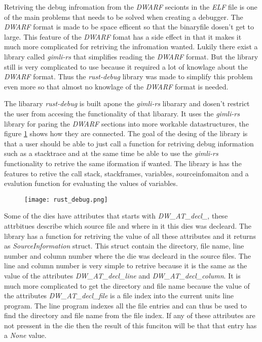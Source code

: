 
Retriving the debug infromation from the \emph{DWARF} secionts in the \emph{ELF} file is one of the main problems that needs to be solved when creating a debugger.
The \emph{DWARF} format is made to be space efficent so that the binaryfile dosen't get to large.
This feature of the \emph{DWARF} fomat has a side effect in that it makes it much more complicated for retriving the infromation wanted.
Lukily there exist a library called \emph{gimli-rs} that simplifies reading the \emph{DWARF} format.
But the library still is very complicated to use because it required a lot of knowlage about the \emph{DWARF} format.
Thus the \emph{rust-debug} library was made to simplify this problem even more so that almost no knowlage of the \emph{DWARF} format is needed.


The libarary \emph{rust-debug} is built apone the \emph{gimli-rs} libarary and dosen't restrict the user from accesing the functionality of that libarary.
It uses the \emph{gimli-rs} library for paring the \emph{DWARF} sections into more workable datastructures, the figure \ref{fig:rustdebug} shows how they are connected.
The goal of the desing of the library is that a user should be able to just call a function for retriving debug information such as a stacktrace and at the same time be able to use the \emph{gimli-rs} functionality to retrive the same iformation if wanted.
The library is has the features to retive the call stack, stackframes, variables, sourceinfomaiton and a evalution function for evaluating the values of variables.


\begin{figure}[h]
    \centering
    \texttt{[image: rust\_debug.png]}
    \label{fig:rustdebug}
\end{figure}


Some of the dies have attributes that starts with \emph{DW\_AT\_decl\_}, these attrbitues describe which source file and where in it this dies was decleard.
The library has a function for retriving the value of all these attributes and it returns as \emph{SourceInformation} struct.
This struct contain the directory, file name, line number and column number where the die was decleard in the source files.
The line and column number is very simple to retrive because it is the same as the value of the attributes \emph{DW\_AT\_decl\_line} and \emph{DW\_AT\_decl\_column}.
It is much more complicated to get the directory and file name because the value of the attributes \emph{DW\_AT\_decl\_file} is a file index into the current units line program.
The line program indexes all the file entries and can thus be used to find the directory and file name from the file index.
If any of these attributes are not pressent in the die then the result of this funciton will be that that entry has a \emph{None} value.




